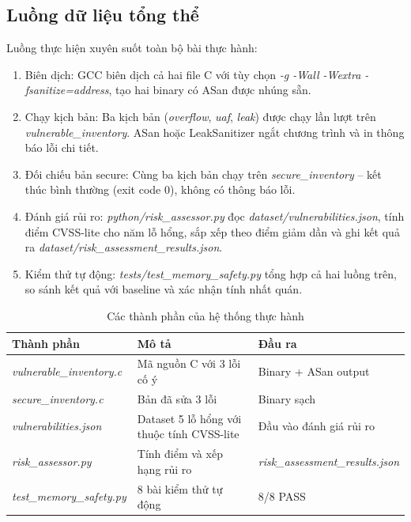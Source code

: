 \subsection{Luồng dữ liệu tổng thể}

Luồng thực hiện xuyên suốt toàn bộ bài thực hành:

\begin{enumerate}
    \item Biên dịch: GCC biên dịch cả hai file C với tùy chọn
          \textit{-g -Wall -Wextra -fsanitize=address}, tạo hai binary có ASan
          được nhúng sẵn.
    \item Chạy kịch bản: Ba kịch bản (\textit{overflow}, \textit{uaf},
          \textit{leak}) được chạy lần lượt trên \textit{vulnerable\_inventory}.
          ASan hoặc LeakSanitizer ngắt chương trình và in thông báo lỗi chi tiết.
    \item Đối chiếu bản secure: Cùng ba kịch bản chạy trên
          \textit{secure\_inventory} -- kết thúc bình thường (exit code 0), không
          có thông báo lỗi.
    \item Đánh giá rủi ro: \textit{python/risk\_assessor.py} đọc
          \textit{dataset/vulnerabilities.json}, tính điểm CVSS-lite cho năm lỗ
          hổng, sắp xếp theo điểm giảm dần và ghi kết quả ra
          \textit{dataset/risk\_assessment\_results.json}.
    \item Kiểm thử tự động: \textit{tests/test\_memory\_safety.py} tổng
          hợp cả hai luồng trên, so sánh kết quả với baseline và xác nhận tính
          nhất quán.
\end{enumerate}

\begin{table}[H]
\centering
\begin{tabularx}{\textwidth}{|p{3.5cm}|X|p{3.5cm}|}
\hline
\textbf{Thành phần} & \textbf{Mô tả} & \textbf{Đầu ra} \\ \hline
\textit{vulnerable\_inventory.c} & Mã nguồn C với 3 lỗi cố ý & Binary + ASan output \\ \hline
\textit{secure\_inventory.c} & Bản đã sửa 3 lỗi & Binary sạch \\ \hline
\textit{vulnerabilities.json} & Dataset 5 lỗ hổng với thuộc tính CVSS-lite & Đầu vào đánh giá rủi ro \\ \hline
\textit{risk\_assessor.py} & Tính điểm và xếp hạng rủi ro & \textit{risk\_assessment\_results.json} \\ \hline
\textit{test\_memory\_safety.py} & 8 bài kiểm thử tự động & 8/8 PASS \\ \hline
\end{tabularx}
\caption{Các thành phần của hệ thống thực hành}
\end{table}
